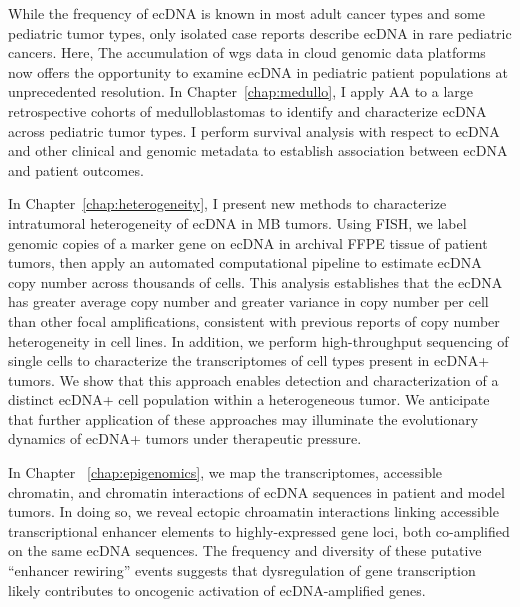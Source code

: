 \par While the frequency of ecDNA is known in most adult cancer types and some pediatric tumor types, only isolated case reports describe ecDNA in rare pediatric cancers. Here, The accumulation of \gls{wgs} data in cloud genomic data platforms now offers the opportunity to examine ecDNA in pediatric patient populations at unprecedented resolution. In Chapter~\ref{chap:medullo}, I apply \gls{AA} to a large retrospective cohorts of medulloblastomas to identify and characterize ecDNA across pediatric tumor types. I perform survival analysis with respect to ecDNA and other clinical and genomic metadata to establish association between ecDNA and patient outcomes. 
\par In Chapter~\ref{chap:heterogeneity}, I present new methods to characterize intratumoral heterogeneity of ecDNA in \gls{MB} tumors. Using \gls{FISH}, we label genomic copies of a marker gene on ecDNA in archival \gls{FFPE} tissue of patient tumors, then apply an automated computational pipeline to estimate ecDNA copy number across thousands of cells. This analysis establishes that the ecDNA has greater average copy number and greater variance in copy number per cell than other focal amplifications, consistent with previous reports of copy number heterogeneity in cell lines\cite{Lange_2021}. In addition, we perform high-throughput sequencing of single cells to characterize the transcriptomes of cell types present in ecDNA+ tumors. We show that this approach enables detection and characterization of a distinct \gls{ecDNA+} cell population within a heterogeneous tumor. We anticipate that further application of these approaches may illuminate the evolutionary dynamics of \gls{ecDNA+} tumors under therapeutic pressure.
\par In Chapter ~\ref{chap:epigenomics}, we map the transcriptomes, accessible chromatin, and chromatin interactions of \gls{ecDNA} sequences in patient and model tumors. In doing so, we reveal ectopic chroamatin interactions linking accessible transcriptional enhancer elements to highly-expressed gene loci, both co-amplified on the same ecDNA sequences.  The frequency and diversity of these putative ``enhancer rewiring'' events suggests that dysregulation of gene transcription likely contributes to oncogenic activation of ecDNA-amplified genes.